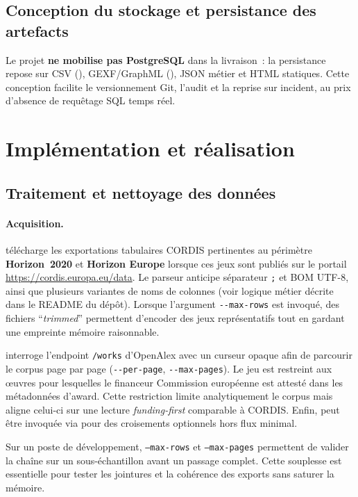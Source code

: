 \documentclass[12pt,a4paper,oneside]{article}
\begin{document}
\subsection{Conception du stockage et persistance des artefacts}
Le projet \textbf{ne mobilise pas PostgreSQL} dans la livraison~: la persistance repose sur CSV (), GEXF/GraphML (), JSON métier et HTML statiques. Cette conception facilite le versionnement Git, l'audit et la reprise sur incident, au prix d'absence de requêtage SQL temps réel.
\newpage
\section{Implémentation et réalisation}

\subsection{Traitement et nettoyage des données}
\paragraph{Acquisition.}
 télécharge les exportations tabulaires CORDIS pertinentes au périmètre \textbf{Horizon~2020} et \textbf{Horizon Europe} lorsque ces jeux sont publiés sur le portail \url{https://cordis.europa.eu/data}. Le parseur anticipe séparateur \texttt{;} et BOM UTF-8, ainsi que plusieurs variantes de noms de colonnes (voir logique métier décrite dans le README du dépôt). Lorsque l'argument \texttt{-{}-max-rows} est invoqué, des fichiers ``\emph{trimmed}'' permettent d'encoder des jeux représentatifs tout en gardant une empreinte mémoire raisonnable.

 interroge l'endpoint \texttt{/works} d'OpenAlex avec un curseur opaque afin de parcourir le corpus page par page (\texttt{-{}-per-page}, \texttt{-{}-max-pages}). Le jeu est restreint aux œuvres pour lesquelles le financeur Commission européenne est attesté dans les métadonnées d'award. Cette restriction limite analytiquement le corpus mais aligne celui-ci sur une lecture \emph{funding-first} comparable à CORDIS. Enfin,  peut être invoquée via  pour des croisements optionnels hors flux minimal.

Sur un poste de développement, \texttt{--max-rows} et \texttt{--max-pages} permettent de valider la chaîne sur un sous-échantillon avant un passage complet. Cette souplesse est essentielle pour tester les jointures et la cohérence des exports sans saturer la mémoire.
\end{document}
